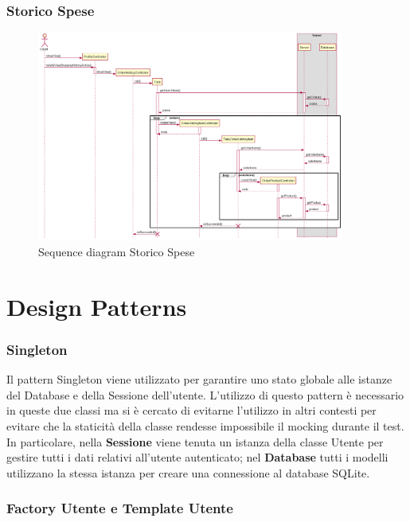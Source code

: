 \documentclass[12pt, a4paper]{report}
\begin{document}
\newpage

\subsubsection{Storico Spese}

\begin{figure}[ht]
  \centering
  \includegraphics[width=0.9\textwidth]{shopping_history_sequence.png}
  \caption{Sequence diagram Storico Spese}
\end{figure}

\newpage

\section{Design Patterns}

\subsubsection{Singleton}	

Il pattern Singleton viene utilizzato per garantire uno stato globale alle
istanze del Database e della Sessione dell'utente. L'utilizzo di questo pattern
è necessario in queste due classi ma si è cercato di evitarne l'utilizzo in
altri contesti per evitare che la staticità della classe rendesse impossibile
il mocking durante il test. In particolare, nella \textbf{Sessione} viene
tenuta un istanza della classe Utente per gestire tutti i dati relativi
all'utente autenticato; nel \textbf{Database} tutti i modelli utilizzano la
stessa istanza per creare una connessione al database SQLite. 

\subsubsection{Factory Utente e Template Utente}
\end{document}
